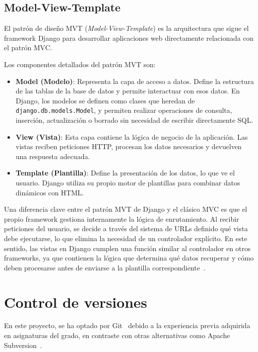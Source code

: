 \subsection{Model-View-Template}

El patrón de diseño MVT (\textit{Model-View-Template}) es la arquitectura que sigue el framework Django para 
desarrollar aplicaciones web directamente relacionada con el patrón MVC.

Los componentes detallados del patrón MVT son:

\begin{itemize}
    \item \textbf{Model (Modelo)}: Representa la capa de acceso a datos. Define la estructura de las tablas de la 
    base de datos y permite interactuar con esos datos. En Django, los modelos se definen como clases que heredan 
    de \texttt{django.db.models.Model}, y permiten realizar operaciones de consulta, inserción, actualización o 
    borrado sin necesidad de escribir directamente SQL.
    
    \item \textbf{View (Vista)}: Esta capa contiene la lógica de negocio de la aplicación. Las vistas reciben 
    peticiones HTTP, procesan los datos necesarios y devuelven una respuesta adecuada.
    
    \item \textbf{Template (Plantilla)}: Define la presentación de los datos, lo que ve el usuario. 
    Django utiliza su propio motor de plantillas para combinar datos dinámicos con HTML. 
    
\end{itemize}

Una diferencia clave entre el patrón MVT de Django y el clásico MVC es que el propio framework gestiona 
internamente la lógica de enrutamiento. Al recibir peticiones del usuario, se decide a través del sistema 
de URLs definido qué vista debe ejecutarse, lo que elimina la necesidad de un controlador explícito. 
En este sentido, las vistas en Django cumplen una función similar al controlador 
en otros frameworks, ya que contienen la lógica que determina qué datos recuperar y cómo deben procesarse 
antes de enviarse a la plantilla correspondiente~\cite{web:djangoMVT}.

\section{Control de versiones}

En este proyecto, se ha optado por Git~\cite{web:Git} debido a la experiencia previa adquirida en asignaturas del grado, 
en contraste con otras alternativas como Apache Subversion~\cite{web:Subversion}.

